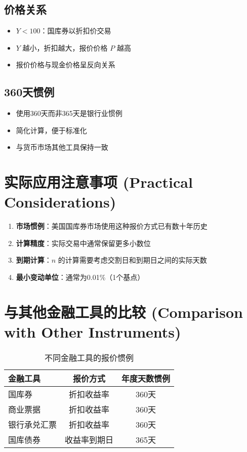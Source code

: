 \subsection{价格关系}
\begin{itemize}
    \item $Y < 100$：国库券以折扣价交易
    \item $Y$ 越小，折扣越大，报价价格 $P$ 越高
    \item 报价价格与现金价格呈反向关系
\end{itemize}

\subsection{360天惯例}
\begin{itemize}
    \item 使用360天而非365天是银行业惯例
    \item 简化计算，便于标准化
    \item 与货币市场其他工具保持一致
\end{itemize}

\section{实际应用注意事项 (Practical Considerations)}

\begin{enumerate}
    \item \textbf{市场惯例}：美国国库券市场使用这种报价方式已有数十年历史
    \item \textbf{计算精度}：实际交易中通常保留更多小数位
    \item \textbf{到期计算}：$n$ 的计算需要考虑交割日和到期日之间的实际天数
    \item \textbf{最小变动单位}：通常为0.01\%（1个基点）
\end{enumerate}

\section{与其他金融工具的比较 (Comparison with Other Instruments)}

\begin{table}[h]
\centering
\begin{tabular}{@{}lcc@{}}
\toprule
金融工具 & 报价方式 & 年度天数惯例 \\
\midrule
国库券 & 折扣收益率 & 360天 \\
商业票据 & 折扣收益率 & 360天 \\
银行承兑汇票 & 折扣收益率 & 360天 \\
国库债券 & 收益率到期日 & 365天 \\
\bottomrule
\end{tabular}
\caption{不同金融工具的报价惯例}
\end{table}

